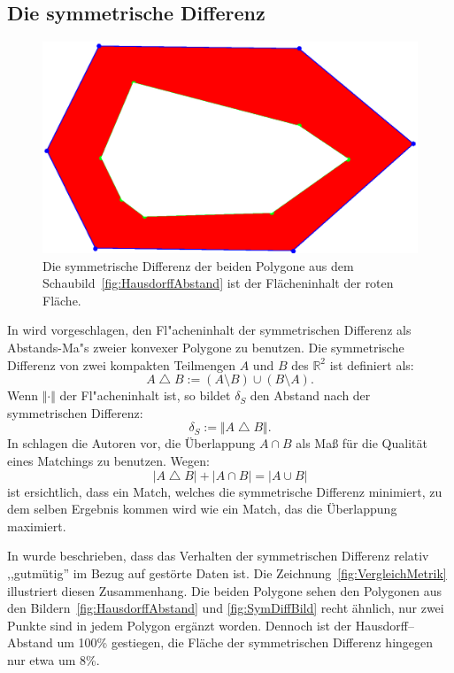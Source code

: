 \subsection{Die symmetrische Differenz}\label{symDiff}
\begin{figure}
	\centering
	\includegraphics[scale=.6]{SymDiff.eps}
	\caption[Die symmetrische Differenz zweier Polygone]{Die symmetrische Differenz der beiden Polygone aus dem Schaubild~\vref{fig:HausdorffAbstand} ist der Flächeninhalt der roten Fläche.}
	\label{fig:SymDiffBild}
\end{figure}

In \cite{AFRW} wird vorgeschlagen, den Fl"acheninhalt der symmetrischen Differenz als Abstands-Ma"s zweier konvexer Polygone zu benutzen. Die symmetrische Differenz von zwei kompakten Teilmengen $A$ und $B$ des $\mathbb{R}^2 $ ist definiert als:
\[A\bigtriangleup B:=(A\setminus B)\cup(B\setminus A).\]
Wenn $\Vert\cdot\Vert$ der Fl"acheninhalt ist, so bildet $\delta_S$ den Abstand nach der symmetrischen Differenz:
\[\delta_S:=\Vert A \bigtriangleup B\Vert.\]
In \cite{TG} schlagen die Autoren vor, die Überlappung $A\cap B$ als Maß für die Qualität eines Matchings zu benutzen. Wegen:
$$|A\bigtriangleup B|+|A\cap B|=|A\cup B|$$
ist ersichtlich, dass ein Match, welches die symmetrische Differenz minimiert, zu dem selben Ergebnis kommen wird wie ein Match, das die Überlappung maximiert.

In \cite{AFRW} wurde beschrieben, dass das Verhalten der symmetrischen Differenz relativ ,,gutmütig'' im Bezug auf gestörte Daten ist. Die Zeichnung~\vref{fig:VergleichMetrik} illustriert diesen Zusammenhang. Die beiden Polygone sehen den Polygonen aus den Bildern~\vref{fig:HausdorffAbstand} und \vref{fig:SymDiffBild} recht ähnlich, nur zwei Punkte sind in jedem Polygon ergänzt worden. Dennoch ist der Hausdorff--Abstand um 100\% gestiegen, die Fläche der symmetrischen Differenz hingegen nur etwa um 8\%.


